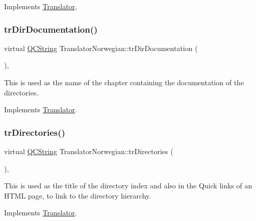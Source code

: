 Implements \mbox{\hyperlink{class_translator}{Translator}}.

\mbox{\label{class_translator_norwegian_aecd4fc64d2bf3623d639fb05d0d3bf86}} 
\subsubsection{\texorpdfstring{trDirDocumentation()}{trDirDocumentation()}}
{\footnotesize\ttfamily virtual \mbox{\hyperlink{class_q_c_string}{Q\+C\+String}} Translator\+Norwegian\+::tr\+Dir\+Documentation (\begin{DoxyParamCaption}{ }\end{DoxyParamCaption})\hspace{0.3cm}{\ttfamily [inline]}, {\ttfamily [virtual]}}

This is used as the name of the chapter containing the documentation of the directories. 

Implements \mbox{\hyperlink{class_translator}{Translator}}.

\mbox{\label{class_translator_norwegian_ab62df548b3f87c04dd9a263ebe28af0e}} 
\subsubsection{\texorpdfstring{trDirectories()}{trDirectories()}}
{\footnotesize\ttfamily virtual \mbox{\hyperlink{class_q_c_string}{Q\+C\+String}} Translator\+Norwegian\+::tr\+Directories (\begin{DoxyParamCaption}{ }\end{DoxyParamCaption})\hspace{0.3cm}{\ttfamily [inline]}, {\ttfamily [virtual]}}

This is used as the title of the directory index and also in the Quick links of an H\+T\+ML page, to link to the directory hierarchy. 

Implements \mbox{\hyperlink{class_translator}{Translator}}.

\mbox{\label{class_translator_norwegian_a023f19a8e39b52387205eb1b1e7fb98d}} 
